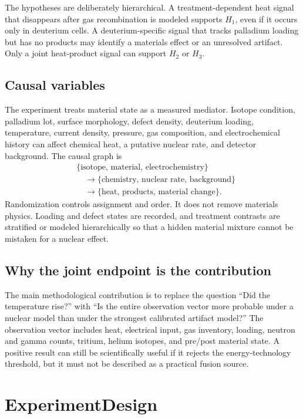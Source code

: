 \documentclass[conference]{IEEEtran}
\begin{document}
The hypotheses are deliberately hierarchical. A treatment-dependent heat signal that disappears after gas recombination is modeled supports $H_1$, even if it occurs only in deuterium cells. A deuterium-specific signal that tracks palladium loading but has no products may identify a materials effect or an unresolved artifact. Only a joint heat-product signal can support $H_2$ or $H_3$.

\subsection{Causal variables}
The experiment treats material state as a measured mediator. Isotope condition, palladium lot, surface morphology, defect density, deuterium loading, temperature, current density, pressure, gas composition, and electrochemical history can affect chemical heat, a putative nuclear rate, and detector background. The causal graph is
\begin{equation}
\begin{aligned}
&\{\text{isotope, material, electrochemistry}\}\\
&\quad\rightarrow\{\text{chemistry, nuclear rate, background}\}\\
&\quad\rightarrow\{\text{heat, products, material change}\}.
\end{aligned}
\label{eq:causal}
\end{equation}
Randomization controls assignment and order. It does not remove materials physics. Loading and defect states are recorded, and treatment contrasts are stratified or modeled hierarchically so that a hidden material mixture cannot be mistaken for a nuclear effect.

\subsection{Why the joint endpoint is the contribution}
The main methodological contribution is to replace the question ``Did the temperature rise?'' with ``Is the entire observation vector more probable under a nuclear model than under the strongest calibrated artifact model?'' The observation vector includes heat, electrical input, gas inventory, loading, neutron and gamma counts, tritium, helium isotopes, and pre/post material state. A positive result can still be scientifically useful if it rejects the energy-technology threshold, but it must not be described as a practical fusion source.

\section{ExperimentDesign}
\label{sec:design}
\end{document}
